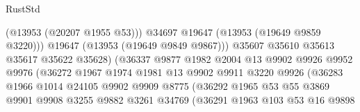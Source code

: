 \begin{lexlean}{RustStd}
\begin{coremodule}
                                            (@13953 (@20207 @1955 @53)))
                                          @34697
                                          @19647
                                          (@13953 (@19649 @9859 @3220)))
                                        @19647
                                        (@13953 (@19649 @9849 @9867)))
                                      @35607
                                      @35610
                                      @35613
                                      @35617
                                      @35622
                                      @35628)
                                    (@36337
                                      @9877
                                      @1982
                                      @2004
                                      @13
                                      @9902
                                      @9926
                                      @9952
                                      @9976
                                      (@36272
                                        @1967
                                        @1974
                                        @1981
                                        @13
                                        @9902
                                        @9911
                                        @3220
                                        @9926
                                        (@36283
                                          @1966
                                          @1014
                                          @24105
                                          @9902
                                          @9909
                                          @8775
                                          (@36292
                                            @1965
                                            @53
                                            @55
                                            @3869
                                            @9901
                                            @9908
                                            @3255
                                            @9882
                                            @3261
                                            @34769
                                            (@36291
                                              @1963
                                              @103
                                              @53
                                              @16
                                              @9898

\end{coremodule}
\end{lexlean}

